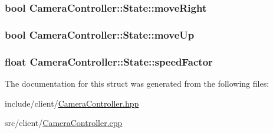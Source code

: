 \hypertarget{structCameraController_1_1State_ab989380708bf4dbfbbf8417f2281f0a1}{
\subsubsection[{move\-Right}]{\setlength{\rightskip}{0pt plus 5cm}bool Camera\-Controller\-::\-State\-::move\-Right}}\label{structCameraController_1_1State_ab989380708bf4dbfbbf8417f2281f0a1}
\hypertarget{structCameraController_1_1State_a0a22ce2b19511a86af3084b4adbca02d}{
\subsubsection[{move\-Up}]{\setlength{\rightskip}{0pt plus 5cm}bool Camera\-Controller\-::\-State\-::move\-Up}}\label{structCameraController_1_1State_a0a22ce2b19511a86af3084b4adbca02d}
\hypertarget{structCameraController_1_1State_ae222e8050372e042f12d5e55119d4a2e}{
\subsubsection[{speed\-Factor}]{\setlength{\rightskip}{0pt plus 5cm}float Camera\-Controller\-::\-State\-::speed\-Factor}}\label{structCameraController_1_1State_ae222e8050372e042f12d5e55119d4a2e}


The documentation for this struct was generated from the following files\-:\begin{DoxyCompactItemize}
\item 
include/client/\hyperlink{CameraController_8hpp}{Camera\-Controller.\-hpp}\item 
src/client/\hyperlink{CameraController_8cpp}{Camera\-Controller.\-cpp}\end{DoxyCompactItemize}
